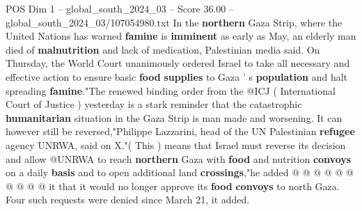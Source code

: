 \begin{textsample}{POS Dim 1 – global\_south\_2024\_03 – Score 36.00 – global\_south\_2024\_03/107054980.txt}
In the \textbf{northern} Gaza Strip, where the United Nations has warned \textbf{famine} is \textbf{imminent} as early as May, an elderly man died of \textbf{malnutrition} and lack of medication, Palestinian media said.
On Thursday, the World Court unanimously ordered Israel to take all necessary and effective action to ensure basic \textbf{food} \textbf{supplies} to Gaza ' s \textbf{population} and halt spreading \textbf{famine}."The renewed binding order from the @ICJ ( International Court of Justice ) yesterday is a stark reminder that the catastrophic \textbf{humanitarian} situation in the Gaza Strip is man made and worsening.
It can however still be reversed,"Philippe Lazzarini, head of the UN Palestinian \textbf{refugee} agency UNRWA, said on X."( This ) means that Israel must reverse its decision and allow @UNRWA to reach \textbf{northern} Gaza with \textbf{food} and nutrition \textbf{convoys} on a daily \textbf{basis} and to open additional land \textbf{crossings},"he added @ @ @ @ @ @ @ @ @ @ it that it would no longer approve its \textbf{food} \textbf{convoys} to north Gaza.
Four such requests were denied since March 21, it added.

\end{textsample}
